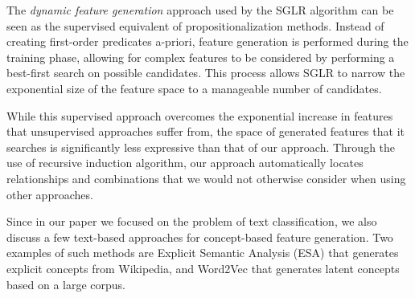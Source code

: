 \documentclass{article}
\theoremstyle{definition}
\begin{document}

The \emph{dynamic feature generation} approach used by the SGLR algorithm \citep{popescul200716} can be seen as the supervised equivalent of propositionalization methods. Instead of creating first-order predicates a-priori, feature generation is performed during the training phase, allowing for complex features to be considered by performing a best-first search on possible candidates.
This process allows SGLR to narrow the exponential size of the feature space to a manageable number of candidates.

While this supervised approach overcomes the exponential increase in features that unsupervised approaches suffer from, the space of generated features that it searches is significantly less expressive than that of our approach.
Through the use of recursive induction algorithm, our approach automatically locates relationships and combinations that we would not otherwise consider when using other approaches.

Since in our paper we focused on the problem of text classification, we also discuss a few text-based approaches for concept-based feature generation. Two examples of such methods are Explicit Semantic Analysis (ESA) \citep{gabrilovich2009wikipediafull} that generates explicit concepts from Wikipedia, and Word2Vec \citep{mikolov2013distributed} that generates latent concepts based on a large corpus. 

\end{document}
